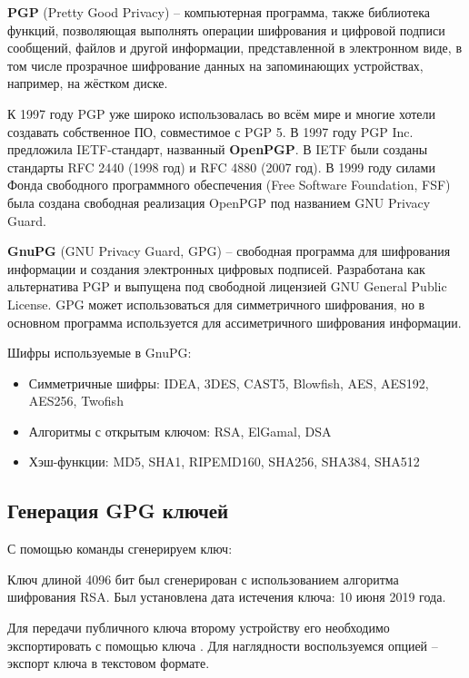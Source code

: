 \textbf{PGP} (Pretty Good Privacy) -- компьютерная программа, также библиотека функций, позволяющая выполнять операции шифрования и цифровой подписи сообщений, файлов и другой информации, представленной в электронном виде, в том числе прозрачное шифрование данных на запоминающих устройствах, например, на жёстком диске.

К 1997 году PGP уже широко использовалась во всём мире и многие хотели создавать собственное ПО, совместимое с PGP 5. В 1997 году PGP Inc. предложила IETF-стандарт, названный \textbf{OpenPGP}. В IETF были созданы стандарты RFC 2440 (1998 год) и RFC 4880 (2007 год). В 1999 году силами Фонда свободного программного обеспечения (Free Software Foundation, FSF) была создана свободная реализация OpenPGP под названием GNU Privacy Guard.

\textbf{GnuPG} (GNU Privacy Guard, GPG) -- свободная программа для шифрования информации и создания электронных цифровых подписей. Разработана как альтернатива PGP и выпущена под свободной лицензией GNU General Public License. GPG может использоваться для симметричного шифрования, но в основном программа используется для ассиметричного шифрования информации.

Шифры используемые в GnuPG:

\begin{itemize}
	\item Симметричные шифры: IDEA, 3DES, CAST5, Blowfish, AES, AES192, AES256, Twofish
	\item Алгоритмы с открытым ключом: RSA, ElGamal, DSA
	\item Хэш-функции: MD5, SHA1, RIPEMD160, SHA256, SHA384, SHA512
\end{itemize}

\subsection{Генерация GPG ключей}

С помощью команды  сгенерируем ключ:



Ключ длиной 4096 бит был сгенерирован с использованием алгоритма шифрования RSA. Был установлена дата истечения ключа: 10 июня 2019 года.

Для передачи публичного ключа второму устройству его необходимо экспортировать с помощью ключа . Для наглядности воспользуемся опцией  -- экспорт ключа в текстовом формате.

